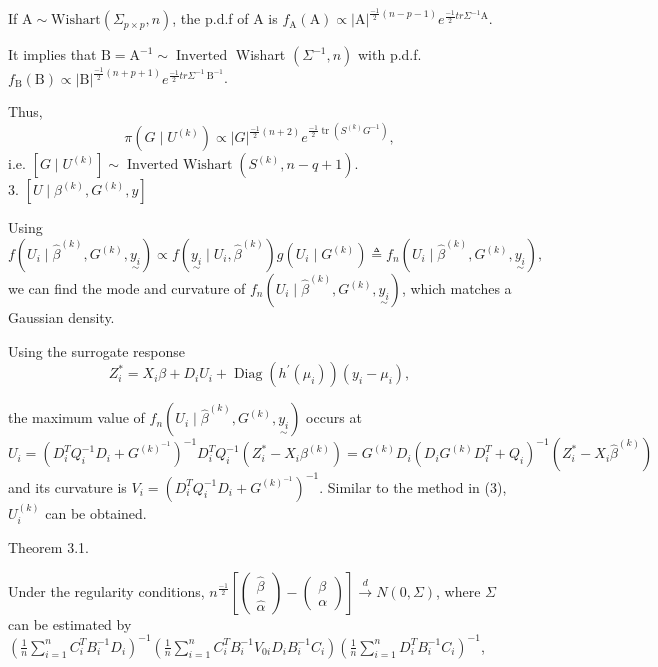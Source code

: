 \documentclass[UTF8,a4paper,10pt]{article}
\begin{document}
{{{If $\mathrm{A} \sim \mathrm{Wishart}\left(\Sigma_{p \times p}, n\right)$, the p.d.f of $\mathrm{A} $ is $f_{\mathrm{A}}(\mathrm{A}) \propto|\mathrm{A}|^{\frac{-1}{2}(n-p-1)} e^{\frac{-1}{2} tr \Sigma^{-1} \mathrm{A}}$. 

It implies that $\mathrm{B}=\mathrm{A}^{-1} \sim \operatorname{Inverted}$ Wishart $\left(\Sigma^{-1}, n\right)$ with p.d.f. $f_{\mathrm{B}}(\mathrm{B}) \propto|\mathrm{B}|^{\frac{-1}{2}(n+p+1)} e^{\frac{-1}{2} t r \Sigma^{-1} \mathrm{~B}^{-1}}$. 

Thus, \[\pi\left(G \mid U^{(k)}\right) \propto|G|^{\frac{-1}{2}(n+2)} e^{\frac{-1}{2} \operatorname{tr}\left(S^{(k)} G^{-1}\right)},\] 
i.e. $\left[G \mid U^{(k)}\right] \sim \operatorname{Inverted~Wishart}\left(S^{(k)}, n-q+1\right)$.
\\

3. $\left[U \mid \beta^{(k)}, G^{(k)}, y\right]$

Using 
\[f\left(U_{i} \mid \hat{\beta}^{(k)}, G^{(k)},\underset{\sim}{y_{i}}\right) \propto f\left(\underset{\sim}{y_{i}} \mid U_{i}, \hat{\beta}^{(k)}\right) g\left(U_{i} \mid G^{(k)}\right) \triangleq f_{n}\left(U_{i} \mid \hat{\beta}^{(k)}, G^{(k)},\underset{\sim}{y_{i}}\right),\] 
we can find the mode and curvature of $f_{n}\left(U_{i} \mid \hat{\beta}^{(k)}, G^{(k)},\underset{\sim}{y_{i}}\right)$, which matches a Gaussian density.

Using the surrogate response \[Z_{i}^{*}=X_{i} \beta+D_{i} U_{i}+\operatorname{Diag}\left(h^{\prime}\left(\mu_{i}\right)\right)\left(y_{i}-\mu_{i}\right),\] 

the maximum value of $f_{n}\left(U_{i} \mid \hat{\beta}^{(k)}, G^{(k)}, \underset{\sim}{y_{i}}\right)$ occurs at 
\[U_{i}=\left(D_{i}^{T} Q_{i}^{-1} D_{i}+G^{(k)^{-1}}\right)^{-1} D_{i}^{T} Q_{i}^{-1}\left(Z_{i}^{*}-X_{i} \beta^{(k)}\right)=G^{(k)} D_{i}\left(D_{i} G^{(k)} D_{i}^{T}+Q_{i}\right)^{-1}\left(Z_{i}^{*}-X_{i} \hat{\beta}^{(k)}\right)\]
and its curvature is $V_{i}=\left(D_{i}^{T} Q_{i}^{-1} D_{i}+G^{(k)^{-1}}\right)^{-1}$. Similar to the method in (3), $U_{i}^{(k)}$ can be obtained.

\pagebreak
\begin{Problem}[]{}
  Theorem 3.1. 
  
  Under the regularity conditions, $n^{\frac{-1}{2}}\left[\left(\begin{array}{l}\hat{\beta} \\ \hat{\alpha}\end{array}\right)-\left(\begin{array}{l}\beta \\ \alpha\end{array}\right)\right] \stackrel{d}{\rightarrow} N(0, \Sigma)$, where $\Sigma$ can be estimated by $\left(\frac{1}{n} \sum_{i=1}^{n} C_{i}^{T} B_{i}^{-1} D_{i}\right)^{-1}\left(\frac{1}{n} \sum_{i=1}^{n} C_{i}^{T} B_{i}^{-1} V_{0 i} D_{i} B_{i}^{-1} C_{i}\right)\left(\frac{1}{n} \sum_{i=1}^{n} D_{i}^{T} B_{i}^{-1} C_{i}\right)^{-1}$,


\end{Problem}}}}
\end{document}
